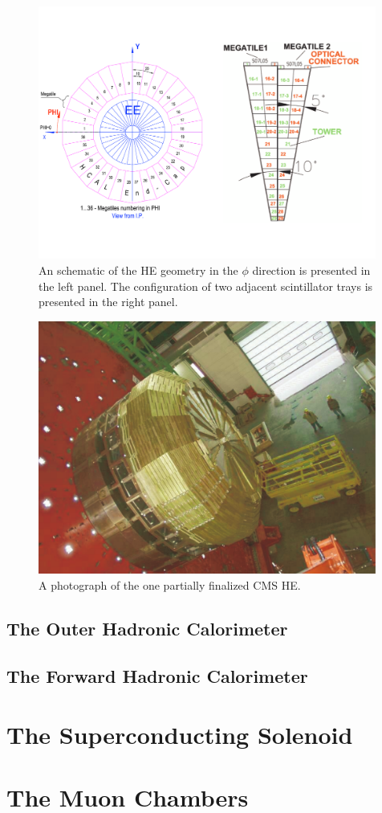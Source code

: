\begin{figure}
 \centering
\includegraphics[width=0.99\textwidth]{CMS_DetectorFigures/hca_tile.pdf}
\caption{An schematic of the HE geometry in the $\phi$ direction is
  presented in the left panel. The configuration of two adjacent
  scintillator trays is presented in the right panel.\label{fig:HEtiles}}
\end{figure}
\begin{figure}
 \centering
\includegraphics[width=0.99\textwidth]{CMS_DetectorFigures/hcal_HE.pdf}
\caption{A photograph of the one partially finalized CMS HE.\label{fig:HE}}
\end{figure}

\subsection{The Outer Hadronic Calorimeter}
\subsection{The Forward Hadronic Calorimeter}
\section{The Superconducting Solenoid}
\section{The Muon Chambers}